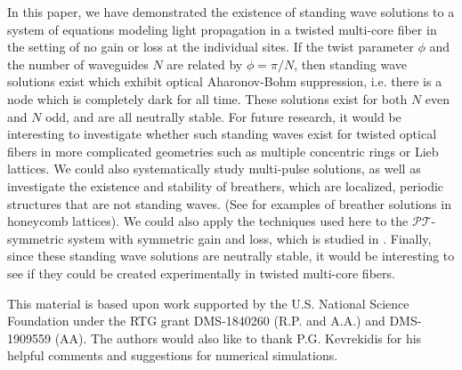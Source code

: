 \documentclass[reprint, amsmath,amssymb,aps,pra]{revtex4-2}
\begin{document}
In this paper, we have demonstrated the existence of standing wave solutions to a system of equations modeling light propagation in a twisted multi-core fiber in the setting of no gain or loss at the individual sites. If the twist parameter $\phi$ and the number of waveguides $N$ are related by $\phi = \pi/N$, then standing wave solutions exist which exhibit optical Aharonov-Bohm suppression, i.e. there is a node which is completely dark for all time. These solutions exist for both $N$ even and $N$ odd, and are all neutrally stable. For future research, it would be interesting to investigate whether such standing waves exist for twisted optical fibers in more complicated geometries such as multiple concentric rings or Lieb lattices. We could also systematically study multi-pulse solutions, as well as investigate the existence and stability of breathers, which are localized, periodic structures that are not standing waves. (See \cite{Lumer2013} for examples of breather solutions in honeycomb lattices). We could also apply the techniques used here to the $\mathcal{PT}$-symmetric system with symmetric gain and loss, which is studied in \cite{castro2016}. Finally, since these standing wave solutions are neutrally stable, it would be interesting to see if they could be created experimentally in twisted multi-core fibers.

\begin{acknowledgments}
This material is based upon work supported by the U.S. National Science Foundation under the RTG grant DMS-1840260 (R.P. and A.A.) and DMS-1909559 (AA). The authors would also like to thank P.G. Kevrekidis for his helpful comments and suggestions for numerical simulations.
\end{acknowledgments}



\end{document}
